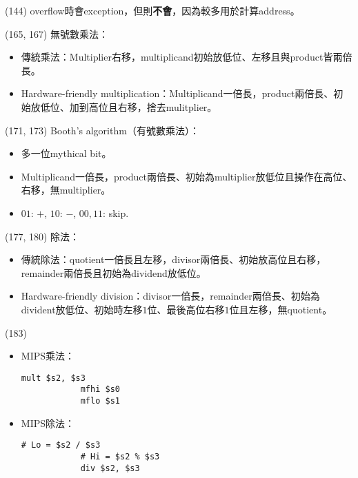 \item \begin{theorem}{(144)}  overflow時會exception，但則\textbf{不會}，因為較多用於計算address。
\end{theorem}

\item \begin{theorem}{(165, 167)} 無號數乘法：\begin{itemize}
        \item 傳統乘法：Multiplier右移，multiplicand初始放低位、左移且與product皆兩倍長。
        \item Hardware-friendly multiplication：Multiplicand一倍長，product兩倍長、初始放低位、加到高位且右移，捨去mulitplier。
    \end{itemize}
\end{theorem}

\item \begin{theorem}{(171, 173)} Booth's algorithm（有號數乘法）：\begin{itemize}
        \item 多一位mythical bit。
        \item Multiplicand一倍長，product兩倍長、初始為multiplier放低位且操作在高位、右移，無multiplier。
        \item $01$: $+$, $10$: $-$, $00, 11$: skip.
    \end{itemize}
\end{theorem}

\item \begin{theorem}{(177, 180)} 除法：\begin{itemize}
        \item 傳統除法：quotient一倍長且左移，divisor兩倍長、初始放高位且右移，remainder兩倍長且初始為dividend放低位。
        \item Hardware-friendly division：divisor一倍長，remainder兩倍長、初始為divident放低位、初始時左移$1$位、最後高位右移$1$位且左移，無quotient。
    \end{itemize}
\end{theorem}

\item \begin{theorem}{(183)} \quad\quad \begin{itemize}
        \item MIPS乘法：\begin{lstlisting}[language={[x86masm]Assembler}]
            mult $s2, $s3
            mfhi $s0
            mflo $s1
        \end{lstlisting} 
        \item MIPS除法：\begin{lstlisting}[language={[x86masm]Assembler}]
            # Lo = $s2 / $s3
            # Hi = $s2 % $s3
            div $s2, $s3
        \end{lstlisting}
    \end{itemize}
\end{theorem}

